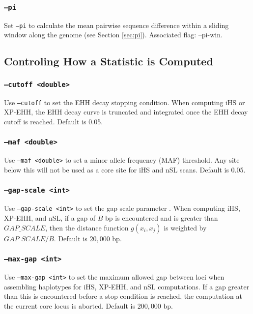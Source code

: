 \documentclass[12pt]{article}%
\begin{document}
\subsubsection{{\tt --pi}}

Set {\tt --pi} to calculate the mean pairwise sequence difference within a sliding window along the genome (see Section \ref{sec:pi}).  Associated flag: {--pi-win}.

\subsection{Controling How a Statistic is Computed}

\subsubsection{{\tt --cutoff <double>}}

Use {\tt --cutoff} to set the EHH decay stopping condition.  When computing iHS or XP-EHH, the EHH decay curve is truncated and integrated once the EHH decay cutoff is reached.  Default is 0.05.

\subsubsection{{\tt --maf <double>}}

Use {\tt --maf <double>} to set a minor allele frequency (MAF) threshold.  Any site below this will not be used as a core site for iHS and nSL scans.  Default is 0.05.

\subsubsection{{\tt --gap-scale <int>}}

Use {\tt --gap-scale <int>} to set the gap scale parameter \cite[]{VoightEtAl06}.  When computing iHS, XP-EHH, and nSL, if a gap of $B$ bp is encountered and is greater than $GAP\_SCALE$, then the distance function $g(x_i,x_j)$ is weighted by $GAP\_SCALE/B$. Default is $20,000$ bp.

\subsubsection{{\tt --max-gap <int>}}

Use {\tt --max-gap <int>} to set the maximum allowed gap between loci when assembling haplotypes for iHS, XP-EHH, and nSL computations.  If a gap greater than this is encountered before a stop condition is reached, the computation at the current core locus is aborted.  Default is $200,000$ bp.
\end{document}
